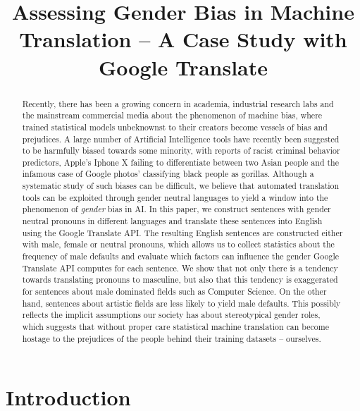 \documentclass[fleqn,10pt]{article}
\title{Assessing Gender Bias in Machine Translation -- A Case Study with Google Translate}
\begin{document}
\maketitle

\begin{abstract}
Recently, there has been a growing concern in academia, industrial research labs and the mainstream commercial media about the phenomenon of machine bias, where trained statistical models unbeknownst to their creators become vessels of bias and prejudices. A large number of Artificial Intelligence tools have recently been suggested to be harmfully biased towards some minority, with reports of racist criminal behavior predictors, Apple's Iphone X failing to differentiate between two Asian people and the infamous case of Google photos' classifying black people as gorillas. Although a systematic study of such biases can be difficult, we believe that automated translation tools can be exploited through gender neutral languages to yield a window into the phenomenon of \emph{gender} bias in AI. 
In this paper, we construct sentences with gender neutral pronouns in different languages 
and translate these sentences into English using the Google Translate API. 
The resulting English sentences are constructed either with male, female or neutral pronouns, which allows us to collect statistics about the frequency of male defaults and evaluate which factors can influence the gender Google Translate 
API computes for each sentence. We show that not only there is a tendency towards translating pronouns to
masculine, but also that this tendency is exaggerated for sentences about male dominated fields such as Computer Science. On the other hand, sentences about artistic fields are less likely to yield male defaults. This possibly reflects the implicit assumptions our society has about stereotypical gender roles, which suggests that without proper care statistical machine translation can become hostage to the prejudices of the people behind their training datasets -- ourselves.
\end{abstract}

\section{Introduction}
\end{document}
